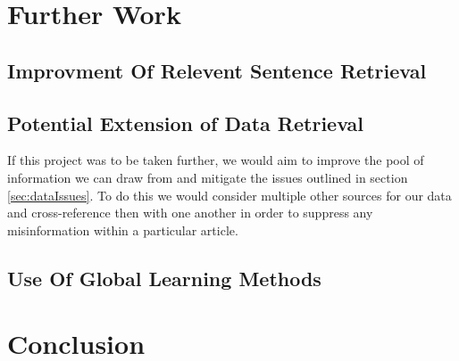 \documentclass[bsc,frontabs,twoside,singlespacing,parskip,deptreport]{infthesis}     %
\begin{document}
\section{Further Work}
\subsection{Improvment Of Relevent Sentence Retrieval}

\subsection{Potential Extension of Data Retrieval}
If this project was to be taken further, we would aim to improve the pool of information we can draw from and mitigate the issues outlined in section \ref{sec:dataIssues}.
To do this we would consider multiple other sources for our data and cross-reference then with one another in order to suppress any misinformation within
a particular article.

\subsection{Use Of Global Learning Methods}


\section{Conclusion}


\end{document}
